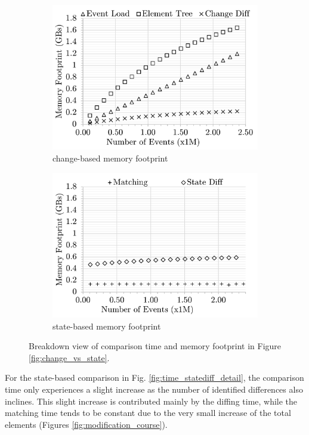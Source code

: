 \documentclass{jot}
\begin{document}
\begin{figure}[ht]
\begin{subfigure}[t]{0.495\linewidth}
        \includegraphics[width=\linewidth]{mixed-memory-events-detail}
        \caption{change-based memory footprint}
        \label{fig:memory_changediff_detail}
    \end{subfigure}
    \hfill
    \begin{subfigure}[t]{0.495\linewidth}
        \includegraphics[width=\linewidth]{state-memory-events-detail}
        \caption{state-based memory footprint}
        \label{fig:memory_statediff_detail}
    \end{subfigure}
    \caption{Breakdown view of comparison time and memory footprint in Figure \ref{fig:change_vs_state}.}
    \label{fig:time_memory_detail}
\end{figure}

For the state-based comparison in Fig. \ref{fig:time_statediff_detail}, the comparison time only experiences a slight increase as the number of identified differences also inclines. This slight increase is contributed mainly by the diffing time, while the matching time tends to be constant due to the very small increase of the total elements (Figures \ref{fig:modification_course}).
\end{document}
